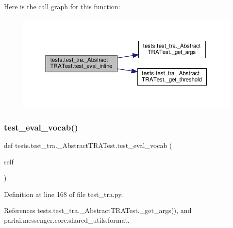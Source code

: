 Here is the call graph for this function\+:
\nopagebreak
\begin{figure}[H]
\begin{center}
\leavevmode
\includegraphics[width=350pt]{classtests_1_1test__tra_1_1__AbstractTRATest_af0ce31577227b0572fb440881dd48be0_cgraph}
\end{center}
\end{figure}
\mbox{\label{classtests_1_1test__tra_1_1__AbstractTRATest_a4576c8054384ac195a275851d2cd3e4f}} 
\subsubsection{\texorpdfstring{test\+\_\+eval\+\_\+vocab()}{test\_eval\_vocab()}}
{\footnotesize\ttfamily def tests.\+test\+\_\+tra.\+\_\+\+Abstract\+T\+R\+A\+Test.\+test\+\_\+eval\+\_\+vocab (\begin{DoxyParamCaption}\item[{}]{self }\end{DoxyParamCaption})}



Definition at line 168 of file test\+\_\+tra.\+py.



References tests.\+test\+\_\+tra.\+\_\+\+Abstract\+T\+R\+A\+Test.\+\_\+get\+\_\+args(), and parlai.\+messenger.\+core.\+shared\+\_\+utils.\+format.

